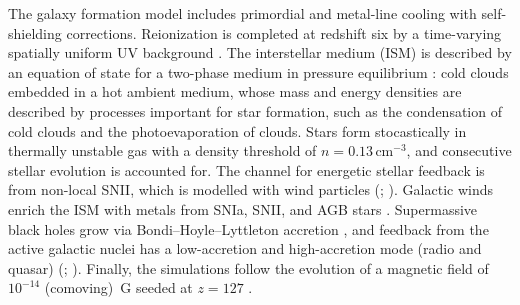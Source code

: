 \documentclass[a4paper,fleqn,usenatbib]{mnras}
\begin{document}
The galaxy formation model includes primordial and metal-line cooling with 
self-shielding corrections. Reionization is completed at redshift six by a
time-varying spatially uniform UV background \citep{2009ApJ...703.1416F, 
2013MNRAS.436.3031V}. The interstellar medium (ISM) is described by an equation of 
state for a two-phase medium in pressure equilibrium \citep{2003MNRAS.339..289S}: 
cold clouds embedded in a hot ambient medium, whose mass and energy densities
are described by processes important for star formation, such as the condensation 
of cold clouds and the photoevaporation of clouds. Stars form stocastically in 
thermally unstable gas with a density threshold of $n = 0.13 \, \text{cm}^{-3}$,
and consecutive stellar evolution is accounted for. The channel for energetic
stellar feedback is from non-local SNII, which is modelled with wind particles
(\citealt{2014MNRAS.437.1750M}; ). Galactic 
winds enrich the ISM
with metals from SNIa, SNII, and AGB stars \citep{2013MNRAS.436.3031V}. Supermassive
black holes grow via Bondi–Hoyle–Lyttleton accretion \citep{1944MNRAS.104..273B,
1952MNRAS.112..195B}, and feedback from the active galactic nuclei has a low-accretion
and high-accretion mode (radio and quasar) (\citealt{2005MNRAS.361..776S, 
2014MNRAS.437.1750M}; ). Finally, the simulations 
follow the evolution of a magnetic field of $10^{-14}$ (comoving)~G seeded at 
$z = 127$ \citep{2013MNRAS.432..176P, 2014ApJ...783L..20P}.
\end{document}
